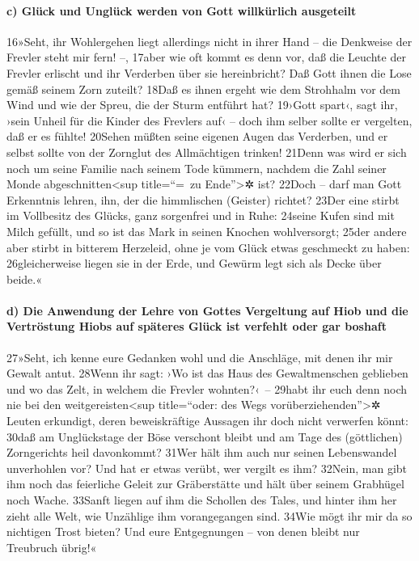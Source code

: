 \hypertarget{c-gluxfcck-und-ungluxfcck-werden-von-gott-willkuxfcrlich-ausgeteilt}{%
\paragraph{c) Glück und Unglück werden von Gott willkürlich
ausgeteilt}\label{c-gluxfcck-und-ungluxfcck-werden-von-gott-willkuxfcrlich-ausgeteilt}}

16»Seht, ihr Wohlergehen liegt allerdings nicht in ihrer Hand -- die
Denkweise der Frevler steht mir fern! --, 17aber wie oft kommt es denn
vor, daß die Leuchte der Frevler erlischt und ihr Verderben über sie
hereinbricht? Daß Gott ihnen die Lose gemäß seinem Zorn zuteilt? 18Daß
es ihnen ergeht wie dem Strohhalm vor dem Wind und wie der Spreu, die
der Sturm entführt hat? 19›Gott spart‹, sagt ihr, ›sein Unheil für die
Kinder des Frevlers auf‹ -- doch ihm selber sollte er vergelten, daß er
es fühlte! 20Sehen müßten seine eigenen Augen das Verderben, und er
selbst sollte von der Zornglut des Allmächtigen trinken! 21Denn was wird
er sich noch um seine Familie nach seinem Tode kümmern, nachdem die Zahl
seiner Monde abgeschnitten\textless sup title=``=~zu Ende''\textgreater✲
ist? 22Doch -- darf man Gott Erkenntnis lehren, ihn, der die himmlischen
(Geister) richtet? 23Der eine stirbt im Vollbesitz des Glücks, ganz
sorgenfrei und in Ruhe: 24seine Kufen sind mit Milch gefüllt, und so ist
das Mark in seinen Knochen wohlversorgt; 25der andere aber stirbt in
bitterem Herzeleid, ohne je vom Glück etwas geschmeckt zu haben:
26gleicherweise liegen sie in der Erde, und Gewürm legt sich als Decke
über beide.«

\hypertarget{d-die-anwendung-der-lehre-von-gottes-vergeltung-auf-hiob-und-die-vertruxf6stung-hiobs-auf-spuxe4teres-gluxfcck-ist-verfehlt-oder-gar-boshaft}{%
\paragraph{d) Die Anwendung der Lehre von Gottes Vergeltung auf Hiob und
die Vertröstung Hiobs auf späteres Glück ist verfehlt oder gar
boshaft}\label{d-die-anwendung-der-lehre-von-gottes-vergeltung-auf-hiob-und-die-vertruxf6stung-hiobs-auf-spuxe4teres-gluxfcck-ist-verfehlt-oder-gar-boshaft}}

27»Seht, ich kenne eure Gedanken wohl und die Anschläge, mit denen ihr
mir Gewalt antut. 28Wenn ihr sagt: ›Wo ist das Haus des Gewaltmenschen
geblieben und wo das Zelt, in welchem die Frevler wohnten?‹~-- 29habt
ihr euch denn noch nie bei den weitgereisten\textless sup title=``oder:
des Wegs vorüberziehenden''\textgreater✲ Leuten erkundigt, deren
beweiskräftige Aussagen ihr doch nicht verwerfen könnt: 30daß am
Unglückstage der Böse verschont bleibt und am Tage des (göttlichen)
Zorngerichts heil davonkommt? 31Wer hält ihm auch nur seinen
Lebenswandel unverhohlen vor? Und hat er etwas verübt, wer vergilt es
ihm? 32Nein, man gibt ihm noch das feierliche Geleit zur Gräberstätte
und hält über seinem Grabhügel noch Wache. 33Sanft liegen auf ihm die
Schollen des Tales, und hinter ihm her zieht alle Welt, wie Unzählige
ihm vorangegangen sind. 34Wie mögt ihr mir da so nichtigen Trost bieten?
Und eure Entgegnungen -- von denen bleibt nur Treubruch übrig!«

